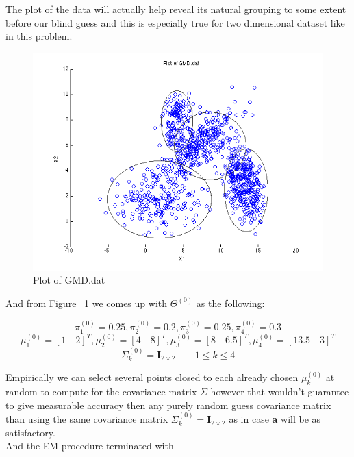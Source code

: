 \documentclass[a4paper]{article}
\begin{document}
The plot of the data will actually help reveal its natural grouping to some extent before our blind guess and this is especially true for two dimensional dataset like in this problem.

\begin{figure}[H]
  \centering
    \includegraphics[scale=.57]{images/GMD_dat.png}
  \caption{Plot of GMD.dat}
  \label{fig:GMD.dat}
\end{figure}

And from Figure ~\ref{fig:GMD.dat} we comes up with $\Theta^{(0)}$ as the following:

$$ \pi_1^{(0)} = 0.25, \pi_2^{(0)} = 0.2, \pi_3^{(0)} = 0.25, \pi_4^{(0)} = 0.3 $$
$$ \mu_1^{(0)} = [1\quad2]^T, \mu_2^{(0)} = [4\quad8]^T, \mu_3^{(0)} = [8\quad6.5]^T, \mu_4^{(0)} = [13.5\quad3]^T $$
$$ \Sigma_k^{(0)} = \mathbf{I}_{2\times2} \qquad 1 \le k \le 4 $$

Empirically we can select several points closed to each already chosen $\mu_k^{(0)}$ at random to compute for the covariance matrix $\Sigma$ however that wouldn't guarantee to give measurable accuracy then any purely random guess covariance matrix than using the same covariance matrix $\Sigma_k^{(0)} = \mathbf{I}_{2\times2}$ as in case \textbf{a} will be as satisfactory.\\

And the EM procedure terminated with
\end{document}
